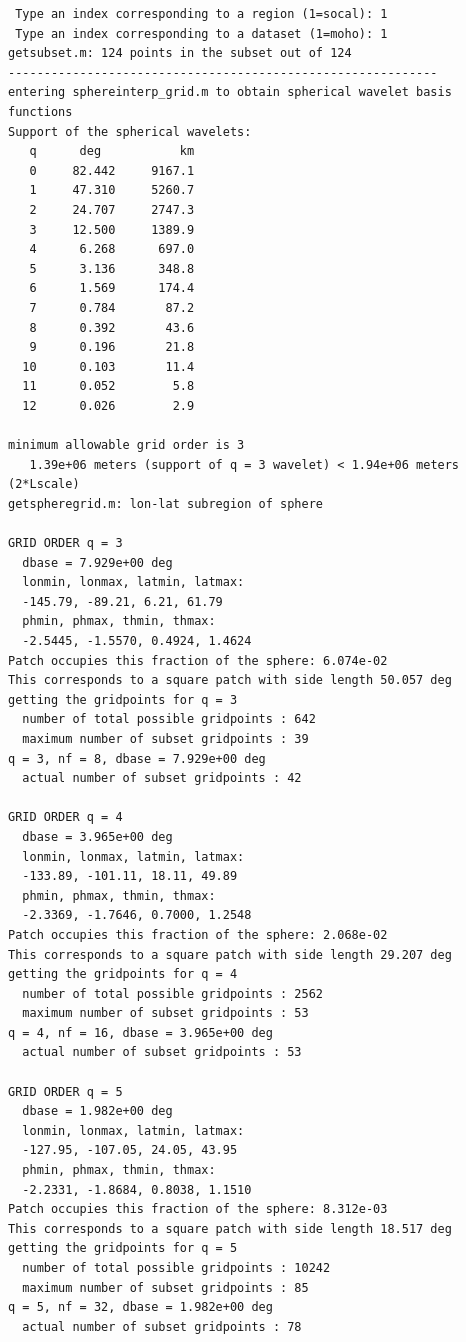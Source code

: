 \documentclass[11pt,titlepage,fleqn]{article}
\begin{document}
\begin{spacing}{1.0}
\begin{verbatim}
 Type an index corresponding to a region (1=socal): 1
 Type an index corresponding to a dataset (1=moho): 1
getsubset.m: 124 points in the subset out of 124
------------------------------------------------------------
entering sphereinterp_grid.m to obtain spherical wavelet basis functions
Support of the spherical wavelets:
   q      deg           km
   0     82.442     9167.1
   1     47.310     5260.7
   2     24.707     2747.3
   3     12.500     1389.9
   4      6.268      697.0
   5      3.136      348.8
   6      1.569      174.4
   7      0.784       87.2
   8      0.392       43.6
   9      0.196       21.8
  10      0.103       11.4
  11      0.052        5.8
  12      0.026        2.9
  
minimum allowable grid order is 3
   1.39e+06 meters (support of q = 3 wavelet) < 1.94e+06 meters (2*Lscale)
getspheregrid.m: lon-lat subregion of sphere
  
GRID ORDER q = 3
  dbase = 7.929e+00 deg
  lonmin, lonmax, latmin, latmax:
  -145.79, -89.21, 6.21, 61.79
  phmin, phmax, thmin, thmax:
  -2.5445, -1.5570, 0.4924, 1.4624
Patch occupies this fraction of the sphere: 6.074e-02
This corresponds to a square patch with side length 50.057 deg
getting the gridpoints for q = 3
  number of total possible gridpoints : 642
  maximum number of subset gridpoints : 39
q = 3, nf = 8, dbase = 7.929e+00 deg
  actual number of subset gridpoints : 42
  
GRID ORDER q = 4
  dbase = 3.965e+00 deg
  lonmin, lonmax, latmin, latmax:
  -133.89, -101.11, 18.11, 49.89
  phmin, phmax, thmin, thmax:
  -2.3369, -1.7646, 0.7000, 1.2548
Patch occupies this fraction of the sphere: 2.068e-02
This corresponds to a square patch with side length 29.207 deg
getting the gridpoints for q = 4
  number of total possible gridpoints : 2562
  maximum number of subset gridpoints : 53
q = 4, nf = 16, dbase = 3.965e+00 deg
  actual number of subset gridpoints : 53
  
GRID ORDER q = 5
  dbase = 1.982e+00 deg
  lonmin, lonmax, latmin, latmax:
  -127.95, -107.05, 24.05, 43.95
  phmin, phmax, thmin, thmax:
  -2.2331, -1.8684, 0.8038, 1.1510
Patch occupies this fraction of the sphere: 8.312e-03
This corresponds to a square patch with side length 18.517 deg
getting the gridpoints for q = 5
  number of total possible gridpoints : 10242
  maximum number of subset gridpoints : 85
q = 5, nf = 32, dbase = 1.982e+00 deg
  actual number of subset gridpoints : 78
  

\end{verbatim}
\end{spacing}
\end{document}
